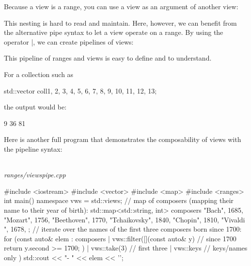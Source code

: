 Because a view is a range, you can use a view as an argument of another view:


This nesting is hard to read and maintain. Here, however, we can benefit from the alternative pipe syntax to let a view operate on a range. By using the operator |, we can create pipelines of views:


This pipeline of ranges and views is easy to define and to understand.

For a collection such as

\begin{cpp}
std::vector coll{1, 2, 3, 4, 5, 6, 7, 8, 9, 10, 11, 12, 13};
\end{cpp}

the output would be:

\begin{shell}
9 36 81
\end{shell}

Here is another full program that demonstrates the composability of views with the pipeline syntax:

\noindent
\hspace*{\fill} \\ %
\textit{ranges/viewspipe.cpp}

\begin{cpp}
#include <iostream>
#include <vector>
#include <map>
#include <ranges>
int main()
{
	namespace vws = std::views;
	// map of composers (mapping their name to their year of birth):
	std::map<std::string, int> composers{
		{"Bach", 1685},
		{"Mozart", 1756},
		{"Beethoven", 1770},
		{"Tchaikovsky", 1840},
		{"Chopin", 1810},
		{"Vivaldi ", 1678},
	};
	// iterate over the names of the first three composers born since 1700:
	for (const auto& elem : composers
		| vws::filter([](const auto& y) { // since 1700
			return y.second >= 1700;
		})
		| vws::take(3) // first three
		| vws::keys // keys/names only
	) {
		std::cout << "- " << elem << '\n';
	}
}
\end{cpp}

